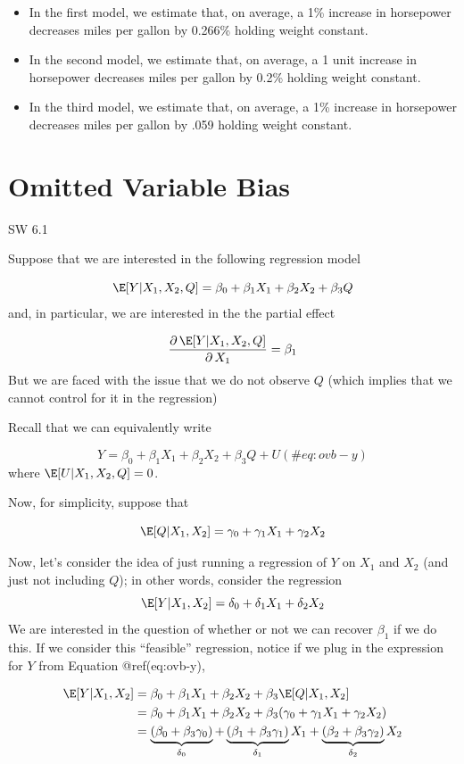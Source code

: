 \documentclass[
  letterpaper,
  DIV=11,
  numbers=noendperiod]{scrreprt}
\begin{document}
\begin{itemize}
\item
  In the first model, we estimate that, on average, a 1\% increase in
  horsepower decreases miles per gallon by 0.266\% holding weight
  constant.
\item
  In the second model, we estimate that, on average, a 1 unit increase
  in horsepower decreases miles per gallon by 0.2\% holding weight
  constant.
\item
  In the third model, we estimate that, on average, a 1\% increase in
  horsepower decreases miles per gallon by .059 holding weight constant.
\end{itemize}

\section{Omitted Variable Bias}\label{omitted-variable-bias}

SW 6.1

Suppose that we are interested in the following regression model

\[
  \E[Y|X_1, X_2, Q] = \beta_0 + \beta_1 X_1 + \beta_2 X_2 + \beta_3 Q
\] and, in particular, we are interested in the the partial effect

\[
  \frac{ \partial \, \E[Y|X_1,X_2,Q]}{\partial \, X_1} = \beta_1
\] But we are faced with the issue that we do not observe \(Q\) (which
implies that we cannot control for it in the regression)

Recall that we can equivalently write

\[
  Y = \beta_0 + \beta_1 X_1 + \beta_2 X_2 + \beta_3 Q + U (\#eq:ovb-y)
\] where \(\E[U|X_1,X_2,Q]=0\).

Now, for simplicity, suppose that

\[
  \E[Q | X_1, X_2] = \gamma_0 + \gamma_1 X_1 + \gamma_2 X_2
\]

Now, let's consider the idea of just running a regression of \(Y\) on
\(X_1\) and \(X_2\) (and just not including \(Q\)); in other words,
consider the regression \[
  \E[Y|X_1,X_2] = \delta_0 + \delta_1 X_1 + \delta_2 X_2
\] We are interested in the question of whether or not we can recover
\(\beta_1\) if we do this. If we consider this ``feasible'' regression,
notice if we plug in the expression for \(Y\) from Equation
@ref(eq:ovb-y),

\[
  \begin{aligned}
  \E[Y|X_1,X_2] &= \beta_0 + \beta_1 X_1 + \beta_2 X_2 + \beta_3 \E[Q|X_1,X_2] \\
  &= \beta_0 + \beta_1 X_1 + \beta_2 X_2 + \beta_3 (\gamma_0 + \gamma_1 X_1 + \gamma_2 X_2) \\
  &= \underbrace{(\beta_0 + \beta_3 \gamma_0)}_{\delta_0} + \underbrace{(\beta_1 + \beta_3 \gamma_1)}_{\delta_1} X_1 + \underbrace{(\beta_2 + \beta_3 \gamma_2)}_{\delta_2} X_2
  \end{aligned}
\]
\end{document}
